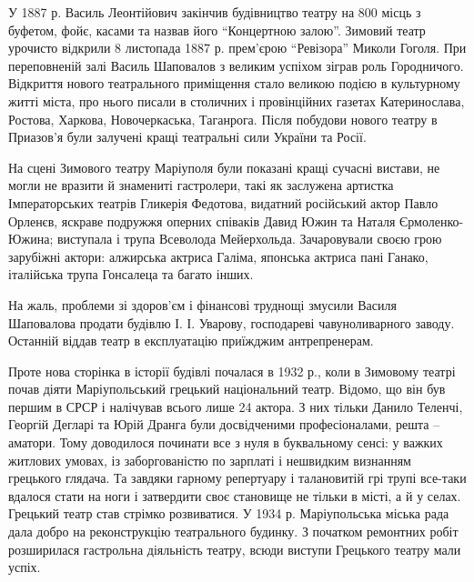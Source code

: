 
У 1887 р. Василь Леонтійович закінчив будівництво театру на 800 місць з
буфетом, фойє, касами та назвав його \enquote{Концертною залою}. Зимовий театр
урочисто відкрили 8 листопада 1887 р. прем'єрою  \enquote{Ревізора} Миколи
Гоголя.  При переповненій залі Василь Шаповалов з великим успіхом зіграв роль
Городничого.  Відкриття нового театрального приміщення стало великою подією в
культурному житті міста, про нього писали в столичних і провінційних газетах
Катеринослава, Ростова, Харкова, Новочеркаська, Таганрога. Після побудови
нового театру в Приазов'я були залучені кращі театральні сили України та Росії.

На сцені Зимового театру Маріуполя були показані кращі сучасні вистави, не
могли не вразити й знамениті гастролери, такі як заслужена артистка
Імператорських театрів Гликерія Федотова, видатний російський актор Павло
Орленєв, яскраве подружжя оперних співаків Давид Южин та Наталя
Єрмоленко-Южина; виступала і трупа Всеволода Мейерхольда. Зачаровували своєю
грою зарубіжні актори: алжирська актриса Галіма, японська актриса пані Ганако,
італійська трупа Гонсалеца та багато інших.

На жаль, проблеми зі здоров'єм і фінансові труднощі змусили Василя Шаповалова
продати будівлю І. І. Уварову, господареві чавуноливарного заводу. Останній
віддав театр в експлуатацію приїжджим антрепренерам.


Проте нова сторінка в історії будівлі почалася в 1932 р., коли в Зимовому
театрі почав діяти Маріупольський грецький національний театр. Відомо, що він
був першим в СРСР і налічував всього лише 24 актора. З них тільки Данило
Теленчі, Георгій Дегларі та Юрій Дранга були досвідченими професіоналами,
решта – аматори. Тому доводилося починати все з нуля в буквальному сенсі: у
важких житлових умовах, із заборгованістю по зарплаті і нешвидким визнанням
грецького глядача. Та завдяки гарному репертуару і талановитій грі трупі
все-таки вдалося стати на ноги і затвердити своє становище не тільки в місті,
а й у селах. Грецький театр став стрімко розвиватися. У 1934 р. Маріупольська
міська рада дала добро на реконструкцію театрального будинку. З початком
ремонтних робіт розширилася гастрольна діяльність театру, всюди виступи
Грецького театру мали успіх.


